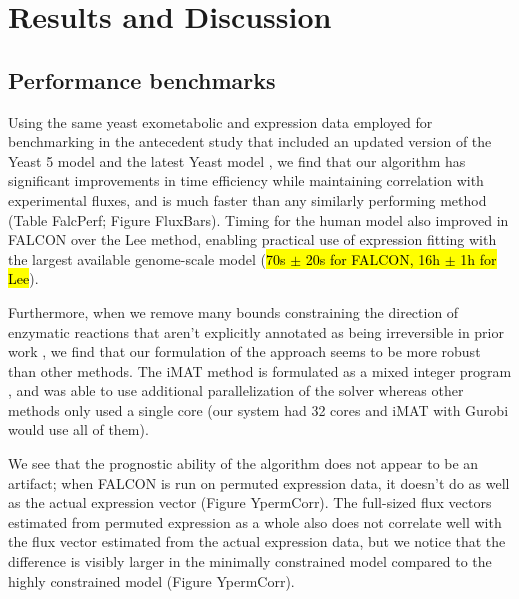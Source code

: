


\section{Results and Discussion}

\subsection{Performance benchmarks}
Using the same yeast exometabolic and expression data employed for
benchmarking in the antecedent study \citep{Lee2012} that included an
updated version of the Yeast 5 model \citep{Heavner2012} and the latest
Yeast model \citep{Aung2013}, we find that
our algorithm has significant improvements in time efficiency while
maintaining correlation with experimental fluxes, and is much faster 
than any similarly performing method (Table FalcPerf; Figure FluxBars).
Timing for the human model also improved in FALCON over 
the Lee method, enabling practical use of expression fitting
with the largest available genome-scale model 
(\hl{70s $\pm$ 20s for FALCON, 16h $\pm$ 1h for Lee}).

Furthermore, when we remove many bounds
constraining the direction of enzymatic reactions that aren't
explicitly annotated as being irreversible in prior work
\citep{Lee2012}, we find that our formulation of the approach seems to
be more robust than other methods. The iMAT method is formulated as a mixed integer program
\citep{Shlomi2008}, and was able to use additional parallelization of
the solver \citep{gurobi} whereas other methods only 
used a single core (our system had 32 cores and
iMAT with Gurobi would use all of them). 

We see that the prognostic ability of the algorithm does not
appear to be an artifact; when FALCON is run on permuted expression data,
it doesn't do as well as the actual expression vector (Figure YpermCorr).
The full-sized flux vectors estimated from permuted expression as a
whole also does not correlate well with the flux vector estimated from
the actual expression data, but we notice that the difference is
visibly larger in the minimally constrained model compared to the
highly constrained model (Figure YpermCorr). 

